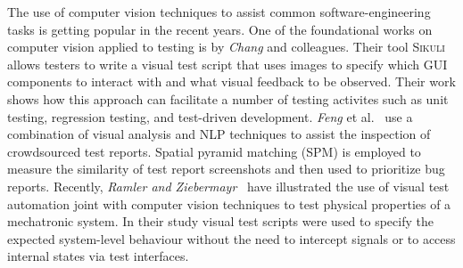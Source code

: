 The use of computer vision techniques to assist common software-engineering tasks is getting popular in the recent years. One of the foundational works on computer vision applied to testing is by \textit{Chang} and colleagues. Their tool \textsc{Sikuli}~\cite{Sikuli} allows testers to write a visual test script that uses images to specify which GUI components to interact with and what visual feedback to be observed. Their work shows how this approach can facilitate a number of testing activites such as unit testing, regression testing, and test-driven development. \textit{Feng} et al.~\cite{Feng:2016:MTR:2970276.2970367} use a combination of visual analysis and NLP techniques to assist the inspection of crowdsourced test reports. Spatial pyramid matching (SPM) is employed to measure the similarity of test report screenshots and then used to prioritize bug reports. 
Recently, \textit{Ramler and Ziebermayr}~\cite{2017-Ramler-ICSTW} have illustrated the use of visual test automation joint with computer vision techniques to test physical properties of a mechatronic system. In their study visual test scripts were used to specify the expected system-level behaviour without the need to intercept signals or to access internal states via test interfaces.
